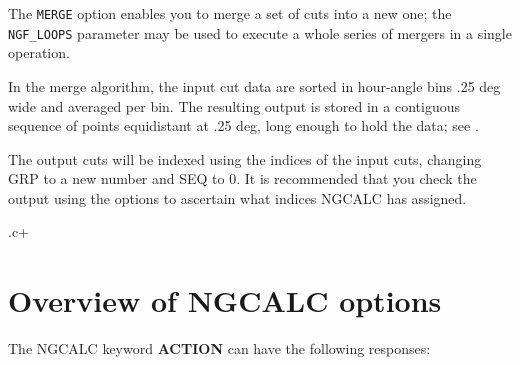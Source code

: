         The \verb/MERGE/ option enables you to merge a set of cuts into a new
one; the \verb/NGF_LOOPS/ parameter may be used to execute a whole series of
mergers in a single operation.

        In the merge algorithm, the input cut data are sorted in hour-angle
bins .25 deg wide and averaged per bin. The resulting output is stored in a
contiguous sequence of points equidistant at .25 deg, long enough to hold the
data; see .



        The output cuts will be indexed using the indices of the input cuts,
changing GRP to a new number and SEQ to 0. It is recommended that you check the
output using the  options to
ascertain what indices NGCALC has assigned.



.c+ 
\section{Overview of NGCALC options} 
\label{.overview} 

The NGCALC keyword {\bf ACTION} can have the following responses: 

